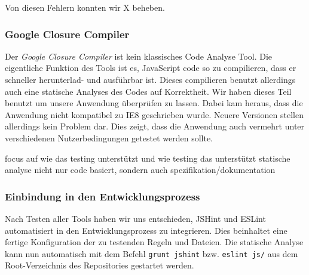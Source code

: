 \documentclass[ngerman]{article}
\begin{document}
Von diesen Fehlern konnten wir X beheben.


\subsubsection{Google Closure Compiler}
Der \emph{Google Closure Compiler} ist kein klassisches Code Analyse Tool.
Die eigentliche Funktion des Tools ist es, JavaScript code so zu compilieren, dass er schneller herunterlad- und ausführbar ist.
Dieses compilieren benutzt allerdings auch eine statische Analyses des Codes auf Korrektheit. Wir haben dieses Teil benutzt um unsere Anwendung überprüfen zu lassen.
Dabei kam heraus, dass die Anwendung nicht kompatibel zu IE8 geschrieben wurde. Neuere Versionen stellen allerdings kein Problem dar. Dies zeigt, dass die Anwendung auch vermehrt unter verschiedenen Nutzerbedingungen getestet werden sollte.

focus auf wie das testing unterstützt und wie testing das unterstützt
statische analyse nicht nur code basiert, sondern auch spezifikation/dokumentation

\subsubsection{Einbindung in den Entwicklungsprozess}
Nach Testen aller Tools haben wir uns entschieden, JSHint und ESLint automatisiert in den Entwicklungsprozess zu integrieren.
Dies beinhaltet eine fertige Konfiguration der zu testenden Regeln und Dateien.
Die statische Analyse kann nun automatisch mit dem Befehl \texttt{grunt jshint} bzw. \texttt{eslint js/} aus dem Root-Verzeichnis des Repositories gestartet werden.
\end{document}
